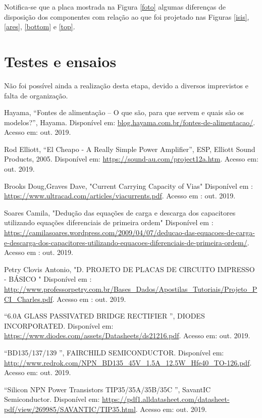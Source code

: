\documentclass[a4paper,12pt,oneside,openany,table,xcdraw]{article}
\begin{document}
Notifica-se que a placa mostrada na Figura \ref{foto} algumas diferenças de disposição dos componentes com relação ao que foi projetado nas Figuras \ref{isis}, \ref{ares}, \ref{bottom} e \ref{top}.

\section{Testes e ensaios}
Não foi possível ainda a realização desta etapa, devido a diversos imprevistos e falta de organização.


\newpage
\begin{thebibliography}{9} 

    Hayama,
    “Fontes de alimentação – O que são, para que servem e quais são os modelos?”, Hayama.
 Disponível em:
 \url{blog.hayama.com.br/fontes-de-alimentacao/}. Acesso em: out. 2019.

    Rod Elliott,
    “El Cheapo - A Really Simple Power Amplifier”, ESP, Elliott Sound Products, 2005.
 Disponível em:
 \url{https://sound-au.com/project12a.htm}. Acesso em: out. 2019.
 
    Brooks Doug,Graves Dave,
    "Current Carrying Capacity of Vias"
 Disponível em : 
 \url{https://www.ultracad.com/articles/viacurrents.pdf}. Acesso em : out. 2019.
 
    Soares Camila,
 "Dedução das equações de carga e descarga dos capacitores utilizando equações diferenciais de primeira ordem"
  Disponível em : 
 \url{https://camilasoares.wordpress.com/2009/04/07/deducao-das-equacoes-de-carga-e-descarga-dos-capacitores-utilizando-equacoes-diferenciais-de-primeira-ordem/}.
 Acesso em : out. 2019.
 
    Petry Clovis Antonio,
 "D. PROJETO DE PLACAS DE CIRCUITO
IMPRESSO - BÁSICO "
  Disponível em : 
 \url{http://www.professorpetry.com.br/Bases_Dados/Apostilas_Tutoriais/Projeto_PCI_Charles.pdf}. Acesso em : out. 2019.
 
 
        “6.0A GLASS PASSIVATED BRIDGE RECTIFIER
”, DIODES INCORPORATED.
 Disponível em:
 \url{https://www.diodes.com/assets/Datasheets/ds21216.pdf}. Acesso em: out. 2019.
 
    “BD135/137/139
”, FAIRCHILD SEMICONDUCTOR.
 Disponível em:
 \url{http://www.redrok.com/NPN_BD135_45V_1.5A_12.5W_Hfe40_TO-126.pdf}. Acesso em: out. 2019.
 
    “Silicon NPN Power Transistors TIP35/35A/35B/35C ”, SavantIC Semiconductor. 
 Disponível em:
 \url{https://pdf1.alldatasheet.com/datasheet-pdf/view/269985/SAVANTIC/TIP35.html}. Acesso em: out. 2019.
 


\end{thebibliography}
\end{document}
